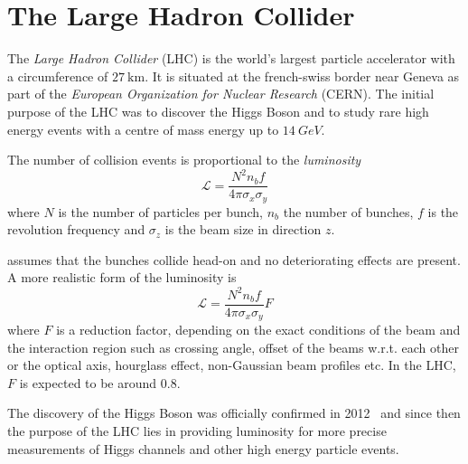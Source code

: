 \section{The Large Hadron Collider}

The \emph{Large Hadron Collider} (LHC) is the world's largest particle accelerator with a circumference
of $\SI{27}{\kilo\meter}$. It is situated at the french-swiss border near Geneva as part of the
\emph{European Organization for Nuclear Research} (CERN).
The initial purpose of the LHC was to discover the Higgs Boson and to study rare high energy events 
with a centre of mass energy up to $\SI{14}{GeV}$.

The number of collision events is proportional to the \emph{luminosity}
%
\begin{equation}
    \mathscr{L} = \frac{N^2 n_b f}{4\pi\sigma_x\sigma_y}
    \label{eq_lumi}
\end{equation}
%
where $N$ is the number of particles per bunch, $n_b$ the number of bunches, $f$ is
the revolution frequency and $\sigma_z$ is the beam size in direction $z$.

 assumes that the bunches collide head-on and no deteriorating effects are present. A more realistic form of the luminosity is~\cite{Herr2003}
%
\begin{equation}
    \mathscr{L} = \frac{N^2 n_b f}{4\pi\sigma_x\sigma_y} F
\end{equation}
%
where $F$ is a reduction factor, depending on the exact conditions of the beam and the interaction region such as crossing angle, offset of the beams w.r.t. each other or the optical axis, hourglass effect, non-Gaussian beam profiles etc. In the LHC, $F$ is expected to be around $0.8$. 

The discovery of the Higgs Boson was officially confirmed in 2012~\cite{higgs} and since then the
purpose of the LHC lies in providing luminosity for more precise measurements of Higgs channels and
other high energy particle events. 

